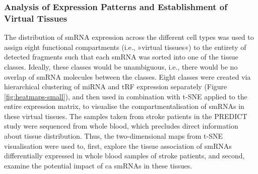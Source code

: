 \begin{method}
\subsubsection{Analysis of Expression Patterns and Establishment of Virtual Tissues}
The distribution of smRNA expression across the different cell types was used to assign eight functional compartments (i.e., »virtual tissues«) to the entirety of detected fragments such that each smRNA was sorted into one of the tissue classes. Ideally, these classes would be unambiguous, i.e., there would be no overlap of smRNA molecules between the classes. Eight classes were created via hierarchical clustering of miRNA and tRF expression separately (Figure \ref{fig:heatmaps-small}), and then used in combination with t-SNE applied to the entire expression matrix, to visualise the compartmentalisation of smRNAs in these virtual tissues. The samples taken from stroke patients in the PREDICT study were sequenced from whole blood, which precludes direct information about tissue distribution. Thus, the two-dimensional maps from t-SNE visualisation were used to, first, explore the tissue association of smRNAs differentially expressed in whole blood samples of stroke patients, and second, examine the potential impact of \acl{ca} smRNAs in these tissues.

\end{method}

